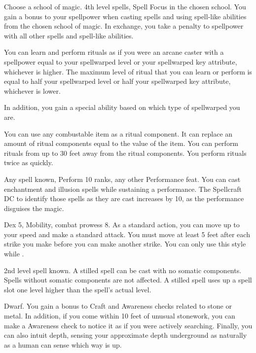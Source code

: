 Choose a school of magic.
\featpres 4th level spells, Spell Focus in the chosen school.
\featben You gain a  bonus to your spellpower when casting spells and using spell-like abilities from the chosen school of magic.
In exchange, you take a  penalty to spellpower with all other spells and spell-like abilities.

\featben You can learn and perform rituals as if you were an arcane caster with a spellpower equal to your spellwarped level or your spellwarped key attribute, whichever is higher.
The maximum level of ritual that you can learn or perform is equal to half your spellwarped level or half your spellwarped key attribute, whichever is lower.

In addition, you gain a special ability based on which type of spellwarped you are.

 \x
{}
You can use any combustable item as a ritual component.
It can replace an amount of ritual components equal to the value of the item.
You can perform rituals from up to 30 feet away from the ritual components.
You perform rituals twice as quickly.

\featpres Any spell known, Perform 10 ranks, any other Performance feat.
\featben You can cast enchantment and illusion spells while sustaining a performance.
The Spellcraft DC to identify those spells as they are cast increases by 10, as the performance disguises the magic.

\featpres Dex 5, Mobility, combat prowess 8.
\featben As a standard action, you can move up to your speed and make a standard attack.
You must move at least 5 feet after each strike you make before you can make another strike.
You can only use this style while \unencumbered.

\featpre 2nd level spell known.
\featben A stilled spell can be cast with no somatic components.
Spells without somatic components are not affected.
A stilled spell uses up a spell slot one level higher than the spell's actual level.

\featpre Dwarf.
\featben You gain a  bonus to Craft and Awareness checks related to stone or metal.
In addition, if you come within 10 feet of unusual stonework, you can make a Awareness check to notice it as if you were actively searching.
Finally, you can also intuit depth, sensing your approximate depth underground as naturally as a human can sense which way is up.

